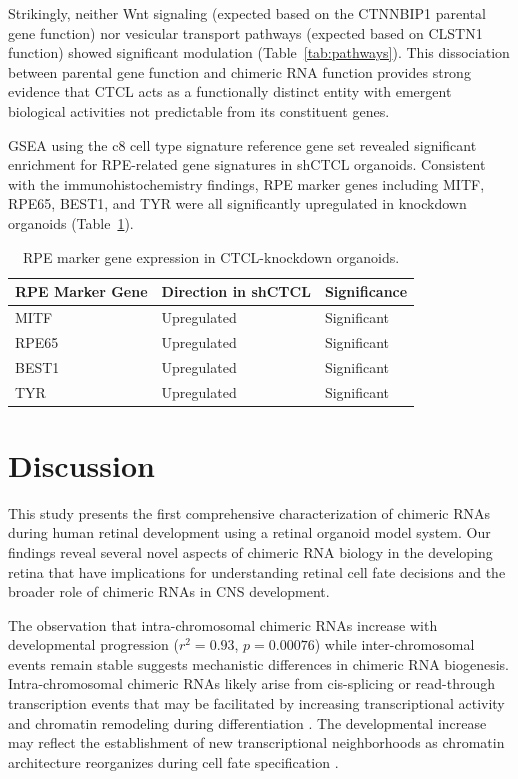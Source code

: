 \documentclass[12pt]{article}
\begin{document}
Strikingly, neither Wnt signaling (expected based on the CTNNBIP1 parental gene function) nor vesicular transport pathways (expected based on CLSTN1 function) showed significant modulation (Table~\ref{tab:pathways}). This dissociation between parental gene function and chimeric RNA function provides strong evidence that CTCL acts as a functionally distinct entity with emergent biological activities not predictable from its constituent genes.

GSEA using the c8 cell type signature reference gene set revealed significant enrichment for RPE-related gene signatures in shCTCL organoids. Consistent with the immunohistochemistry findings, RPE marker genes including MITF, RPE65, BEST1, and TYR were all significantly upregulated in knockdown organoids (Table~\ref{tab:rpe}).

\begin{table}[htbp]
\centering
\caption{RPE marker gene expression in CTCL-knockdown organoids.}
\label{tab:rpe}
\begin{tabular}{lll}
\toprule
RPE Marker Gene & Direction in shCTCL & Significance \\
\midrule
MITF & Upregulated & Significant \\
RPE65 & Upregulated & Significant \\
BEST1 & Upregulated & Significant \\
TYR & Upregulated & Significant \\
\bottomrule
\end{tabular}
\end{table}

\section{Discussion}

This study presents the first comprehensive characterization of chimeric RNAs during human retinal development using a retinal organoid model system. Our findings reveal several novel aspects of chimeric RNA biology in the developing retina that have implications for understanding retinal cell fate decisions and the broader role of chimeric RNAs in CNS development.

The observation that intra-chromosomal chimeric RNAs increase with developmental progression ($r^2 = 0.93$, $p = 0.00076$) while inter-chromosomal events remain stable suggests mechanistic differences in chimeric RNA biogenesis. Intra-chromosomal chimeric RNAs likely arise from cis-splicing or read-through transcription events that may be facilitated by increasing transcriptional activity and chromatin remodeling during differentiation \citep{kannan2011recurrent}. The developmental increase may reflect the establishment of new transcriptional neighborhoods as chromatin architecture reorganizes during cell fate specification \citep{clark2019single}.
\end{document}
